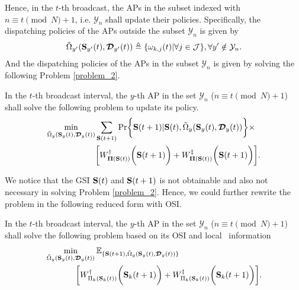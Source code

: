 Hence, in the $t$-th broadcast, the APs in the subset indexed with $n \equiv t \pmod{N} + 1$, i.e. $\mathcal{Y}_{n}$ shall update their policies.
Specifically, the dispatching policies of the APs outside the subset $\mathcal{Y}_{n}$ is given by
\begin{align}
    \tilde{\Omega}_{y'}( \mathbf{S}_{y'}(t),\boldsymbol{\mathcal{D}}_{y'}(t) ) \triangleq \{ \omega_{k,j}(t) | \forall j\in\mathcal{J} \}, \forall y'\notin\mathcal{Y}_{n}.
\end{align}
And the dispatching policies of the APs in the subset $\mathcal{Y}_{n}$ is given by solving the following Problem \ref{problem_2}.

\begin{problem}[]
    In the $t$-th broadcast interval, the $y$-th AP in the set $\mathcal{Y}_{n}$ ($n \equiv t \pmod{N} + 1$) shall solve the following problem to update its policy.
    {\small
    \begin{align}
        \min_{ \tilde{\Omega}_{y}(\Stat_{y}(t),\Delay_{y}(t)) }
        &\sum_{\Stat(t+1)} \Pr\Brace{
            \Stat(t+1) | \Stat(t), \tilde{\Omega}_{y}(\Stat_{y}(t),\Delay_{y}(t))
        } \times
        \nonumber\\
        &\Bracket{
            W^{\AP}_{\Baseline(\Stat(t))} \Paren{\Stat(t+1)} +
            W^{\ES}_{\Baseline(\Stat(t))} \Paren{\Stat(t+1)}
        }.
    \end{align}
    }
    \label{problem_2}
\end{problem}
We notice that the GSI $\mathbf{S}(t)$ and $\mathbf{S}(t+1)$ is not obtainable and also not necessary in solving Problem \ref{problem_2}.
Hence, we could further rewrite the problem in the following reduced form with OSI.
\begin{problem}[]
    In the $t$-th broadcast interval, the $y$-th AP in the set $\mathcal{Y}_{n}$ ($n \equiv t \pmod{N} + 1$) shall solve the following problem based on its OSI and local \brlatency~information
    {\small
    \begin{align}
        &\min_{\tilde{\Omega}_{y}(\mathbf{S}_{y}(t),\boldsymbol{\mathcal{D}}_{y}(t))}
        \mathbb{E}_{\{\mathbf{S}(t+1), \tilde{\Omega}_{y}(\mathbf{S}_{y}(t),\boldsymbol{\mathcal{D}}_{y}(t))\}}
        \nonumber\\
        &~~~~~~~~~~~\bigg[
            W^{\dagger}_{ \Pi_{k}(\mathbf{S}_{k}(t)) }\bigg(\mathbf{S}_{k}(t+1)\bigg) +
            W^{\ddagger}_{ \Pi_{k}(\mathbf{S}_{k}(t)) }\bigg(\mathbf{S}_{k}(t+1)\bigg)
        \bigg].
        \label{eqn:partial}
    \end{align}
    }
    \label{problem_3}
\end{problem}

